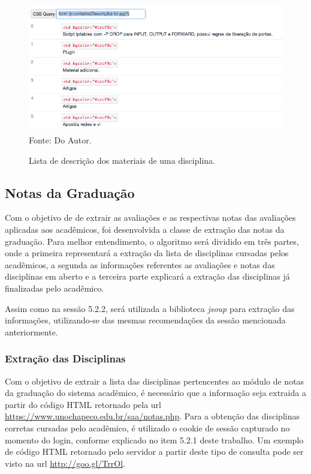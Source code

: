 \begin{figure}[!htb]
     \centering
     \caption[Extração de Informações - Lista das descrições dos materiais]{Lista de descrição dos materiais de uma disciplina.}
     \includegraphics[scale=0.6]{imagens/listamateriaisdisciplinasdescricao.png}
     \\  Fonte: Do Autor.
\end{figure}

\newpage

\subsection{Notas da Graduação}
Com o objetivo de de extrair as avaliações e as respectivas notas das avaliações aplicadas aos acadêmicos, foi desenvolvida a classe de extração das notas da graduação. Para melhor entendimento, o algoritmo será dividido em três partes, onde a primeira representará a extração da lista de disciplinas cursadas pelos acadêmicos, a segunda as informações referentes as avaliações e notas das disciplinas em aberto e a terceira parte explicará a extração das disciplinas já finalizadas pelo acadêmico.

Assim como na sessão 5.2.2, será utilizada a biblioteca \emph{jsoup} para extração das informações, utilizando-se das mesmas recomendações da sessão mencionada anteriormente.

\subsubsection{Extração das Disciplinas}
Com o objetivo de extrair a lista das disciplinas pertencentes ao módulo de notas da graduação do sistema acadêmico, é necessário que a informação seja extraida a partir do código HTML retornado pela url \url{https://www.unochapeco.edu.br/saa/notas.php}. Para a obtenção das disciplinas corretas cursadas pelo acadêmico, é utilizado o cookie de sessão capturado no momento do login, conforme explicado no item 5.2.1 deste trabalho. Um exemplo de código HTML retornado pelo servidor a partir deste tipo de consulta pode ser visto na url \url{http://goo.gl/TrrOl}.


